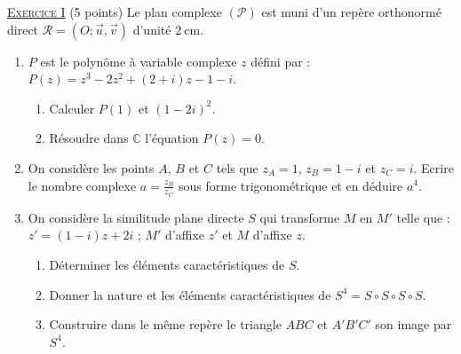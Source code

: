 \providecommand{\Plan}{(\mathscr{P})}
\providecommand{\Ouv}{(O ; \vec{u}, \vec{v})}
\providecommand{\cm}{~\mathrm{cm}}
\providecommand{\Courbe}{(\mathscr{C})}
\providecommand{\CourbeP}{(\mathscr{C}')}
\providecommand{\D}{(\mathscr{D})}
\providecommand{\dx}{~\mathrm{d}x}

\noindent \underline{\textsc{Exercice I}} (5 points) \newline
      Le plan complexe $\Plan$ est muni d'un rep\`ere orthonorm\'e direct $\mathcal{R} = \Ouv$ d'unit\'e $2\cm$.
      \begin{enumerate}
            \item $P$ est le polyn\^ome \`a variable complexe $z$ d\'efini par : $P(z) = z^3 - 2z^2 + (2+i) z - 1 - i$.
                  \begin{enumerate}
                        \item Calculer $P(1)$ et $(1-2i)^2$.
                        \item R\'esoudre dans $\mathbb{C}$ l'\'equation $P(z) = 0$.
                  \end{enumerate}
            \item On consid\`ere les points $A$, $B$ et $C$ tels que $z_A = 1$, $z_B = 1-i$ et $z_C = i$.
                  Ecrire le nombre complexe $a = \frac{z_B}{z_C}$ sous forme trigonom\'etrique et en d\'eduire $a^4$.
            \item On consid\`ere la similitude plane directe $S$ qui transforme $M$ en $M'$ telle que : 
                  $z' = (1-i) z + 2i$ ; $M'$ d'affixe $z'$ et $M$ d'affixe $z$.
                  \begin{enumerate}
                        \item D\'eterminer les \'el\'ements caract\'eristiques de $S$.
                        \item Donner la nature et les \'el\'ements caract\'eristiques de $S^4 = S \circ S \circ S \circ S$.
                        \item Construire dans le m\^eme rep\`ere le triangle $ABC$ et $A'B'C'$ son image par $S^4$.
                  \end{enumerate}
      \end{enumerate}
